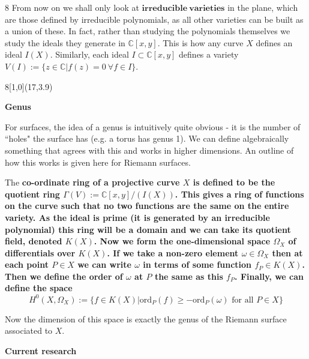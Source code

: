\documentclass[a1,portrait]{a0poster}
\def\Head#1{{\noindent\raggedright{\large\textsf{\textbf{#1}}}\par}}
\begin{document}
\begin{textblock}{8}
From now on we shall only look at $\mathbf{irreducible\ varieties}$ in the plane, which are those defined by irreducible polynomials, as all other varieties can be built as a union of these. In fact, rather than studying the polynomials themselves we study the ideals they generate in $\mathbb{C}[x,y]$. This is how any curve $X$ defines an ideal $I(X)$. Similarly, each ideal $I\subset \mathbb{C}[x,y]$ defines a variety $V(I):=\{z\in \mathbb{C}|f(z)=0\ \forall f\in I\}$.




\end{textblock}

\begin{textblock}{8}[1,0](17,3.9)



\Head{Genus}
 For surfaces, the idea of a genus is intuitively quite obvious - it is the number of ``holes" the surface has (e.g. a torus has genus 1). We can define algebraically something that agrees with this and works in higher dimensions. An outline of how this works is given here for Riemann surfaces.

The \bf co-ordinate ring \rm of a projective curve $X$ is defined to be the quotient ring $\Gamma(V):=\mathbb{C}[x,y]/(I(X))$. This gives a ring of functions on the curve such that no two functions are the same on the entire variety. As the ideal is prime (it is generated by an irreducible polynomial) this ring will be a domain and we can take its quotient field, denoted $K(X)$. Now we form the one-dimensional space $\Omega_X$ of differentials over $K(X)$. If we take a non-zero element $\omega\in \Omega_X$ then at each point $P\in X$ we can write $\omega$ in terms of some function $f_P\in K(X)$. Then we define the order of $\omega$ at $P$ the same as this $f_P$. Finally, we can define the space
\[
H^0(X,\Omega_X):=\{f\in K(X)|\mbox{ord}_P(f)\geq -\mbox{ord}_P(\omega)\mbox{ for all } P\in X\}
\]

Now the dimension of this space is exactly the genus of the Riemann surface associated to $X$\cite{hart}.


\Head{Current research}


\end{textblock}
\end{document}
